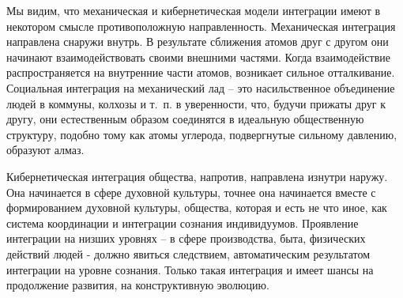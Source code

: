 \documentclass{book}
\begin{document}
Мы видим, что механическая и кибернетическая модели ин­теграции имеют в некотором смысле противоположную на­правленность. Механическая интеграция направлена снаружи внутрь. В результате сближения атомов друг с другом они на­чинают взаимодействовать своими внешними частями. Когда взаимодействие распространяется на внутренние части атомов, возникает сильное отталкивание. Социальная интеграция на механический лад -- это насильственное объединение людей в коммуны, колхозы и т.~п. в уверенности, что, будучи прижаты друг к другу, они естественным образом соединятся в идеаль­ную общественную структуру, подобно тому как атомы углерода, подвергнутые сильному давлению, образуют алмаз.

Кибернетическая интеграция общества, напротив, направ­лена изнутри наружу. Она начинается в сфере духовной куль­туры, точнее она начинается вместе с  формированием духов­ной культуры, общества, которая и есть не что иное, как си­стема координации и интеграции сознания индивидуумов. Про­явление интеграции на низших уровнях -- в сфере производст­ва, быта, физических действий людей - должно явиться следст­вием, автоматическим результатом интеграции на уровне со­знания. Только такая интеграция и имеет шансы на продолже­ние развития, на конструктивную эволюцию.
\end{document}
